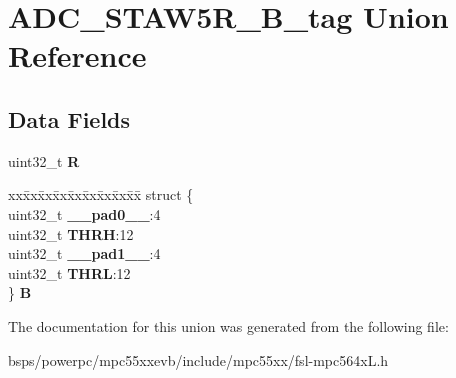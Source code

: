 \hypertarget{unionADC__STAW5R__32B__tag}{}\section{A\+D\+C\+\_\+\+S\+T\+A\+W5\+R\+\_\+B\+\_\+tag Union Reference}
\label{unionADC__STAW5R__32B__tag}
\subsection*{Data Fields}
\begin{DoxyCompactItemize}
\item 
\mbox{\label{unionADC__STAW5R__32B__tag_a1f9c23efc24ef5b8eaffbaa1b9039012}} 
uint32\+\_\+t {\bfseries R}
\item 
\mbox{\label{unionADC__STAW5R__32B__tag_af008835505236ec8987eeb528584ddf7}} 
\begin{tabbing}
xx\=xx\=xx\=xx\=xx\=xx\=xx\=xx\=xx\=\kill
struct \{\\
\>uint32\_t {\bfseries \_\_pad0\_\_}:4\\
\>uint32\_t {\bfseries THRH}:12\\
\>uint32\_t {\bfseries \_\_pad1\_\_}:4\\
\>uint32\_t {\bfseries THRL}:12\\
\} {\bfseries B}\\

\end{tabbing}\end{DoxyCompactItemize}


The documentation for this union was generated from the following file\+:\begin{DoxyCompactItemize}
\item 
bsps/powerpc/mpc55xxevb/include/mpc55xx/fsl-\/mpc564x\+L.\+h\end{DoxyCompactItemize}
